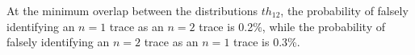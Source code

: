 
At the minimum overlap between the distributions $th_{12}$,
the probability of falsely identifying an $n=1$ trace as an $n=2$ trace is 0.2\%,
while
the probability of falsely identifying an $n=2$ trace as an $n=1$ trace is 0.3\%.
\vspace{1cm}
%
%
